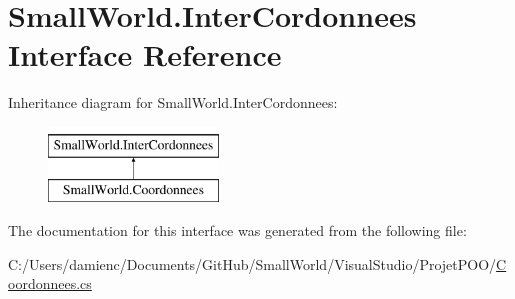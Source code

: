 \hypertarget{interface_small_world_1_1_inter_cordonnees}{\section{Small\-World.\-Inter\-Cordonnees Interface Reference}
\label{interface_small_world_1_1_inter_cordonnees}
}
Inheritance diagram for Small\-World.\-Inter\-Cordonnees\-:\begin{figure}[H]
\begin{center}
\leavevmode
\includegraphics[height=2.000000cm]{interface_small_world_1_1_inter_cordonnees}
\end{center}
\end{figure}


The documentation for this interface was generated from the following file\-:\begin{DoxyCompactItemize}
\item 
C\-:/\-Users/damienc/\-Documents/\-Git\-Hub/\-Small\-World/\-Visual\-Studio/\-Projet\-P\-O\-O/\hyperlink{_coordonnees_8cs}{Coordonnees.\-cs}\end{DoxyCompactItemize}
